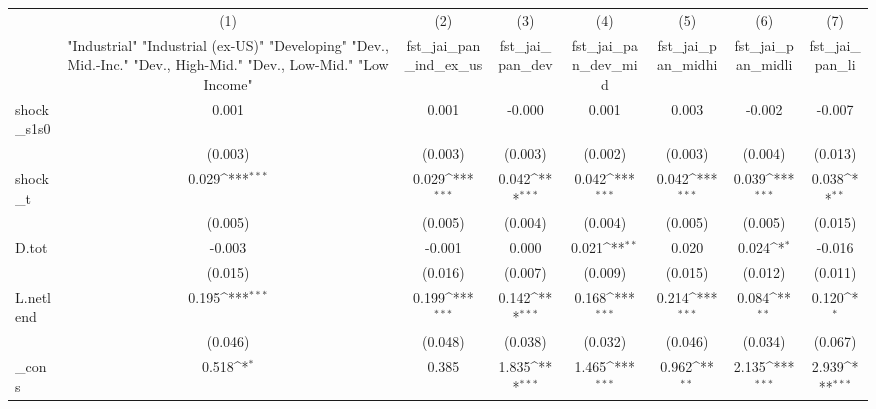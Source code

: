 {
\def\sym#1{\ifmmode^{#1}\else\(^{#1}\)\fi}
\begin{tabular}{l*{7}{c}}
\toprule
            &\multicolumn{1}{c}{(1)}&\multicolumn{1}{c}{(2)}&\multicolumn{1}{c}{(3)}&\multicolumn{1}{c}{(4)}&\multicolumn{1}{c}{(5)}&\multicolumn{1}{c}{(6)}&\multicolumn{1}{c}{(7)}\\
            &\multicolumn{1}{c}{ "Industrial" "Industrial (ex-US)" "Developing" "Dev., Mid.-Inc." "Dev., High-Mid."  "Dev., Low-Mid." "Low Income" }&\multicolumn{1}{c}{fst\_jai\_pan\_ind\_ex\_us}&\multicolumn{1}{c}{fst\_jai\_pan\_dev}&\multicolumn{1}{c}{fst\_jai\_pan\_dev\_mid}&\multicolumn{1}{c}{fst\_jai\_pan\_midhi}&\multicolumn{1}{c}{fst\_jai\_pan\_midli}&\multicolumn{1}{c}{fst\_jai\_pan\_li}\\
\midrule
shock\_s1s0  &       0.001         &       0.001         &      -0.000         &       0.001         &       0.003         &      -0.002         &      -0.007         \\
            &     (0.003)         &     (0.003)         &     (0.003)         &     (0.002)         &     (0.003)         &     (0.004)         &     (0.013)         \\
\addlinespace
shock\_t     &       0.029\sym{***}&       0.029\sym{***}&       0.042\sym{***}&       0.042\sym{***}&       0.042\sym{***}&       0.039\sym{***}&       0.038\sym{**} \\
            &     (0.005)         &     (0.005)         &     (0.004)         &     (0.004)         &     (0.005)         &     (0.005)         &     (0.015)         \\
\addlinespace
D.tot       &      -0.003         &      -0.001         &       0.000         &       0.021\sym{**} &       0.020         &       0.024\sym{*}  &      -0.016         \\
            &     (0.015)         &     (0.016)         &     (0.007)         &     (0.009)         &     (0.015)         &     (0.012)         &     (0.011)         \\
\addlinespace
L.netlend   &       0.195\sym{***}&       0.199\sym{***}&       0.142\sym{***}&       0.168\sym{***}&       0.214\sym{***}&       0.084\sym{**} &       0.120\sym{*}  \\
            &     (0.046)         &     (0.048)         &     (0.038)         &     (0.032)         &     (0.046)         &     (0.034)         &     (0.067)         \\
\addlinespace
\_cons      &       0.518\sym{*}  &       0.385         &       1.835\sym{***}&       1.465\sym{***}&       0.962\sym{**} &       2.135\sym{***}&       2.939\sym{***}\\

\end{tabular}}
